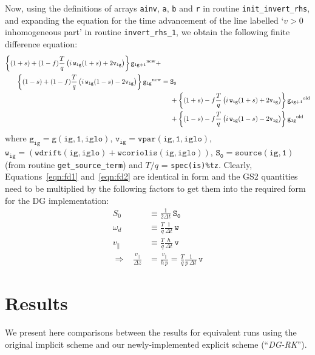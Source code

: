 \documentclass[10pt,a4paper]{article}
\begin{document}
Now, using the definitions of arrays \texttt{ainv}, \texttt{a}, \texttt{b} and
\texttt{r} in routine \texttt{init\_invert\_rhs}, and expanding the equation
for the time advancement of the line labelled `$v>0$ inhomogeneous part' in
routine \texttt{invert\_rhs\_1}, we obtain the following finite difference
equation:
\begin{align}
  \left\{ (1+s)+(1-f) \frac{T}{q} \left( i\, \mathtt{w_{ig}} (1+s) +
      2\mathtt{v_{ig}} \right) \right\} \mathtt{g_{ig+1}}^{\mbox{\scriptsize
      new}} + \;\;\;\;\; & \nonumber \\
  \left\{ (1-s)+(1-f) \frac{T}{q} \left( i\, \mathtt{w_{ig}} (1-s) -
      2\mathtt{v_{ig}} \right)
  \right\} \mathtt{g_{ig}}^{\mbox{\scriptsize new}} = {}& \mathtt{S_0} \nonumber \\
  & + \left\{ (1+s)-f \frac{T}{q} \left( i\,\mathtt{w_{ig}} (1+s) +
      2\mathtt{v_{ig}} \right)
  \right\} \mathtt{g_{ig+1}}^{\mbox{\scriptsize old}} \nonumber \\
  & + \left\{ (1-s)-f \frac{T}{q} \left( i\,\mathtt{w_{ig}} (1-s) -
      2\mathtt{v_{ig}} \right) \right\} \mathtt{g_{ig}}^{\mbox{\scriptsize
      old}}
\label{eqn:fd2}
\end{align}
where $\mathtt{g_{ig} = g(ig,1,iglo)}$, $\mathtt{v_{ig} = vpar(ig,1,iglo)}$,
$\mathtt{w_{ig} = (wdrift(ig,iglo) + wcoriolis(ig,iglo))}$, $\mathtt{S_0 =
  source(ig,1)}$ (from routine \texttt{get\_source\_term}) and $T/q$ =
\texttt{spec(is)\%tz}. Clearly, Equations~\ref{eqn:fd1} and~\ref{eqn:fd2} are
identical in form and the GS2 quantities need to be multiplied by the
following factors to get them into the required form for the DG
implementation:
\begin{align*}
S_0 & \equiv \frac{1}{2 \Delta t} \, \mathtt{S_0} \\
\omega_d & \equiv \frac{T}{q} \frac{1}{\Delta t} \, \mathtt{w} \\
v_\parallel & \equiv \frac{T}{q} \frac{h}{\Delta t} \, \mathtt{v} \\
\Longrightarrow \;\;\; \frac{v_\parallel}{\Delta z} & =
\frac{v_\parallel}{h\,p} = \frac{T}{q} \frac{1}{p\,\Delta t} \, \mathtt{v}
\end{align*}

\section{Results}

We present here comparisons between the results for equivalent runs using the
original implicit scheme and our newly-implemented explicit scheme (``\textit{DG-RK}'').
\end{document}
